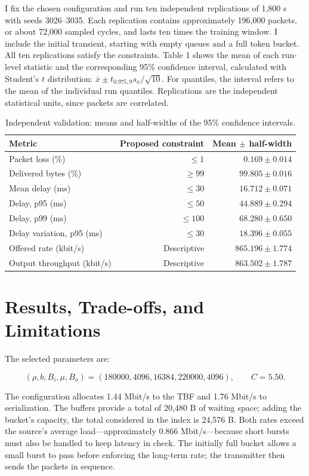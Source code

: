 \documentclass[10pt,a4paper]{article}
\begin{document}
I fix the chosen configuration and run ten independent replications of 1,800 s
with seeds 3026--3035. Each replication contains approximately 196,000 packets,
or about 72,000 sampled cycles, and lasts ten times the training window. I include
the initial transient, starting with empty queues and a full token bucket.
All ten replications satisfy the constraints. Table 1 shows the mean of each
run-level statistic and the corresponding 95\% confidence interval, calculated
with Student's $t$ distribution: $\bar x\pm t_{0.975,9}s_x/\sqrt{10}$.
For quantiles, the interval refers to the mean of the individual run quantiles.
Replications are the independent statistical units, since packets are correlated.

\begin{table}[h]
\centering\small
\caption{Independent validation: means and half-widths of the 95\% confidence intervals.}
\begin{tabular}{lrr}\toprule
Metric & Proposed constraint & Mean $\pm$ half-width\\\midrule
Packet loss (\%) & $\leq 1$ & $0.169 \pm 0.014$ \\
Delivered bytes (\%) & $\geq 99$ & $99.805 \pm 0.016$ \\
Mean delay (ms) & $\leq 30$ & $16.712 \pm 0.071$ \\
Delay, p95 (ms) & $\leq 50$ & $44.889 \pm 0.294$ \\
Delay, p99 (ms) & $\leq 100$ & $68.280 \pm 0.650$ \\
Delay variation, p95 (ms) & $\leq 30$ & $18.396 \pm 0.055$ \\
Offered rate (kbit/s) & Descriptive & $865.196 \pm 1.774$ \\
Output throughput (kbit/s) & Descriptive & $863.502 \pm 1.787$ \\
\bottomrule\end{tabular}
\end{table}
\clearpage

\section{Results, Trade-offs, and Limitations}
The selected parameters are:

\begin{equation}
    (\rho,b,B_i,\mu,B_o)=(180000,4096,16384,220000,4096),\qquad C=5.50.
\end{equation}

The configuration allocates 1.44 Mbit/s to the TBF and 1.76 Mbit/s to serialization. The buffers provide a total of 20,480
B of waiting space; adding the bucket’s capacity, the total considered in the index is 24,576 B. Both rates
exceed the source’s average load—approximately 0.866 Mbit/s—because short bursts must also be handled to keep latency in check.
The initially full bucket allows a small burst to pass before enforcing the long-term rate; the transmitter
then sends the packets in sequence.
\end{document}
